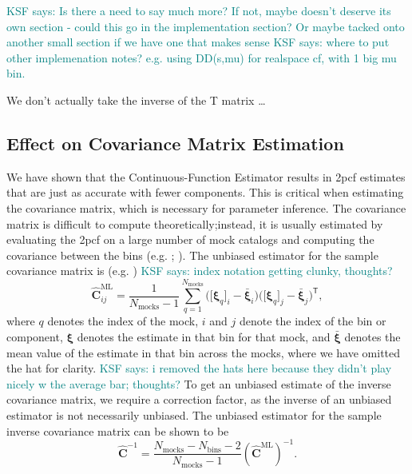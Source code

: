 \documentclass[modern]{aastex62}
\newcommand{\cf}{2pcf\xspace} %
\newcommand{\est}{the Continuous-Function Estimator\xspace}
\newcommand{\inv}{^{-1}}
\newcommand{\T}{^{\mathsf{T}}}
\newcommand{\bld}[1]{\bm{#1}} %
\newcommand{\NN}[1]{N_\mathrm{#1}}
\newcommand{\KSF}[1]{\textcolor{teal}{KSF says: #1}}
\begin{document}
\KSF{Is there a need to say much more? If not, maybe doesn't deserve its own section - could this go in the implementation section? Or maybe tacked onto another small section if we have one that makes sense}
\KSF{where to put other implemenation notes? e.g. using DD(s,mu) for realspace cf, with 1 big mu bin.}

We don't actually take the inverse of the T matrix \ldots

\subsection{Effect on Covariance Matrix Estimation}

We have shown that \est results in \cf estimates that are just as accurate with fewer components.
This is critical when estimating the covariance matrix, which is necessary for parameter inference.
The covariance matrix is difficult to compute theoretically;instead, it is usually estimated by evaluating the \cf on a large number of mock catalogs and computing the covariance between the bins (e.g. \citealt{Reid2010}; \citealt{Anderson2014}).
The unbiased estimator for the sample covariance matrix is (e.g. \citealt{Anderson2003})
\KSF{index notation getting clunky, thoughts?}
\begin{equation}
\bld{\hat{C}}^\mathrm{ML}_{ij} = \frac{1}{\NN{mocks}-1} \sum_{q=1}^{\NN{mocks}} \bigg( \big[\bld{\xi}_q \big]_i - \bar{\bld{\xi}}_i \bigg) \bigg([\bld{\xi}_q \big]_j - \bar{\bld{\xi}}_j \bigg)\T,
\end{equation}
where $q$ denotes the index of the mock, $i$ and $j$ denote the index of the bin or component, $\bld{\xi}$ denotes the estimate in that bin for that mock, and $\bar{\bld{\xi}}$ denotes the mean value of the estimate in that bin across the mocks, where we have omitted the hat for clarity. \KSF{i removed the hats here because they didn't play nicely w the average bar; thoughts?}
To get an unbiased estimate of the inverse covariance matrix, we require a correction factor, as the inverse of an unbiased estimator is not necessarily unbiased.
The unbiased estimator for the sample inverse covariance matrix can be shown to be \citep{Hartlap2007}
\begin{equation}
\bld{\hat{C}}\inv = \frac{\NN{mocks}-\NN{bins}-2}{\NN{mocks}-1} \left( \bld{\hat{C}}^\mathrm{ML} \right) \inv.
\end{equation}
\end{document}

